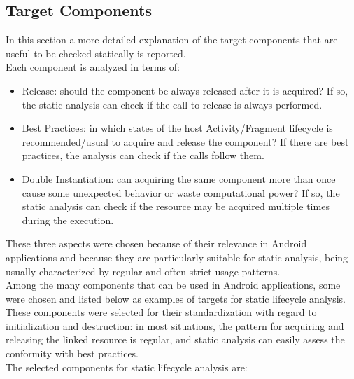 \documentclass[11pt,a4paper,notitlepage]{article}
\begin{document}
\subsection{Target Components}
In this section a more detailed explanation of the target components that are useful to be checked statically is reported.\bigskip \\
Each component is analyzed in terms of:
\begin{itemize}
	\item Release: should the component be always released after it is acquired? If so, the static analysis can check if the call to release is always performed.
	\item Best Practices: in which states of the host Activity/Fragment lifecycle is recommended/usual to acquire and release the component? If there are best practices, the analysis can check if the calls follow them.
	\item Double Instantiation: can acquiring the same component more than once cause some unexpected behavior or waste computational power? If so, the static analysis can check if the resource may be acquired multiple times during the execution.
\end{itemize}
These three aspects were chosen because of their relevance in Android applications and because they are particularly suitable for static analysis, being usually characterized by regular and often strict usage patterns.\bigskip \\
Among the many components that can be used in Android applications, some were chosen and listed below as examples of targets for static lifecycle analysis. These components were selected for their standardization with regard to initialization and destruction: in most situations, the pattern for acquiring and releasing the linked resource is regular, and static analysis can easily assess the conformity with best practices.\bigskip \\
The selected components for static lifecycle analysis are:
\end{document}
